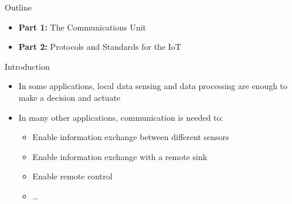 \documentclass[aspectratio=169,11pt]{beamer}
\begin{document}
\begin{frame}{Outline}
    \begin{itemize}
        \item \textbf{Part 1:} The Communications Unit
        \item \textbf{Part 2:} Protocols and Standards for the IoT
    \end{itemize}
\end{frame}

\begin{frame}{Introduction}
    \begin{itemize}
        \item In some applications, local data sensing and data processing are enough to make a decision and actuate
        \item In many other applications, communication is needed to:
        \begin{itemize}
            \item Enable information exchange between different sensors
            \item Enable information exchange with a remote sink
            \item Enable remote control
            \item \ldots
        \end{itemize}
    \end{itemize}
\end{frame}
\end{document}
